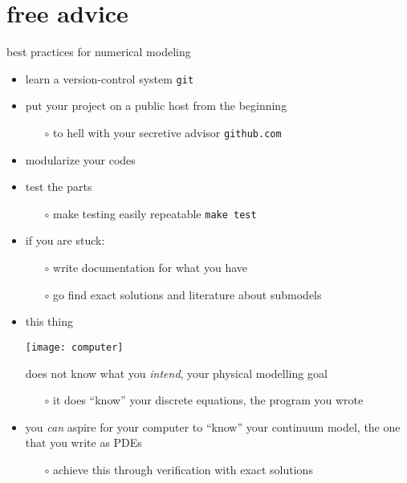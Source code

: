 \section{free advice}

\begin{frame}{best practices for numerical modeling}

\begin{itemize}
\item learn a version-control system \hfill \alert{\texttt{git}}
\item put your project on a public host from the beginning
  \begin{itemize}
  \item[$\circ$] to hell with your secretive advisor \hfill \alert{\texttt{github.com}}
  \end{itemize}
\item modularize your codes
\item test the parts
  \begin{itemize}
  \item[$\circ$] make testing easily repeatable \hfill \alert{\texttt{make test}}
  \end{itemize}
\item if you are stuck:
  \begin{itemize}
  \item[$\circ$] write documentation for what you have
  \item[$\circ$] go find exact solutions and literature about submodels
  \end{itemize}
\end{itemize}
\end{frame}


\begin{frame}{}
\begin{itemize}
\item this thing

\vspace{-10mm}
\begin{center}
\texttt{[image: computer]}
\end{center}
\alert{does not know what you \emph{intend}}, your physical modelling goal
   \begin{itemize}
   \item[$\circ$] it does ``know'' your discrete equations, the program you wrote
   \end{itemize}

\bigskip
\item you \emph{can} aspire for your computer to ``know'' your continuum model, the one that you write as PDEs
   \begin{itemize}
   \item[$\circ$] achieve this through verification with exact solutions
   \end{itemize}
\end{itemize}

\end{frame}
